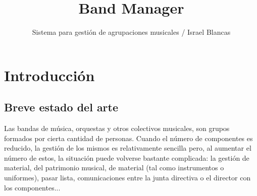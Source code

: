 \documentclass[11pt,spanish]{article}
\title{Band Manager}
\author{Sistema para gestión de agrupaciones musicales
        \newline / Israel Blancas}
\begin{document}
\maketitle

\tableofcontents
\clearpage

\section{Introducción}

\subsection{Breve estado del arte}

\noindent
Las bandas de música, orquestas y otros colectivos musicales, son grupos
formados por cierta cantidad de personas. Cuando el número de componentes es reducido,
la gestión de los mismos es relativamente sencilla pero, al aumentar el número de estos,
la situación puede volverse bastante complicada: la gestión de material, del patrimonio
musical, de material (tal como instrumentos o uniformes),
pasar lista, comunicaciones entre la junta directiva o el director con los componentes...
\end{document}
